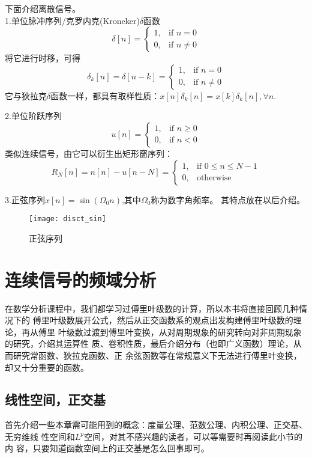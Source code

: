 \documentclass{ctexbook}
\begin{document}
下面介绍离散信号。\\
1.单位脉冲序列/克罗内克(Kroneker)$\delta$函数
\[\delta[n]=\begin{cases}
        1, & \text{if }n=0     \\
        0, & \text{if }n\neq 0
    \end{cases}\]
将它进行时移，可得\[\delta_k[n]=\delta[n-k]=\begin{cases}
        1, & \text{if }n=0     \\
        0, & \text{if }n\neq 0
    \end{cases}\]
它与狄拉克$\delta$函数一样，都具有取样性质：$x[n]\delta_k[n]=x[k]\delta_k[n],\forall n$.

\noindent 2.单位阶跃序列\[u[n]=\begin{cases}
        1, & \text{if }n\geq 0 \\
        0, & \text{if }n< 0
    \end{cases}\]
类似连续信号，由它可以衍生出矩形窗序列：
\[R_N[n]=n[n]-u[n-N]=\begin{cases}
        1, & \text{if }0\leq n\leq N-1 \\
        0, & \text{otherwise}
    \end{cases}\]

\noindent 3.正弦序列$x[n]=\sin(\Omega_0n)$,其中$\Omega_0$称为数字角频率。
其特点放在以后介绍。
\begin{figure}[htbp]
    \centering
    \texttt{[image: disct\_sin]}
    \caption{正弦序列}
\end{figure}

\chapter{连续信号的频域分析}%
在数学分析课程中，我们都学习过傅里叶级数的计算，所以本书将直接回顾几种情况下的
傅里叶级数展开公式，然后从正交函数系的观点出发构建傅里叶级数的理论，再从傅里
叶级数过渡到傅里叶变换，从对周期现象的研究转向对非周期现象的研究，介绍其运算性
质、卷积性质，最后介绍分布（也即广义函数）理论，从而研究常函数、狄拉克函数、正
余弦函数等在常规意义下无法进行傅里叶变换，却又十分重要的函数。

\section{线性空间，正交基}\label{sec:Linear_Space}
首先介绍一些本章需可能用到的概念：度量公理、范数公理、内积公理、正交基、无穷维线
性空间和$L^p$空间，对其不感兴趣的读者，可以等需要时再阅读此小节的内
容，只要知道函数空间上的正交基是怎么回事即可。
\end{document}
